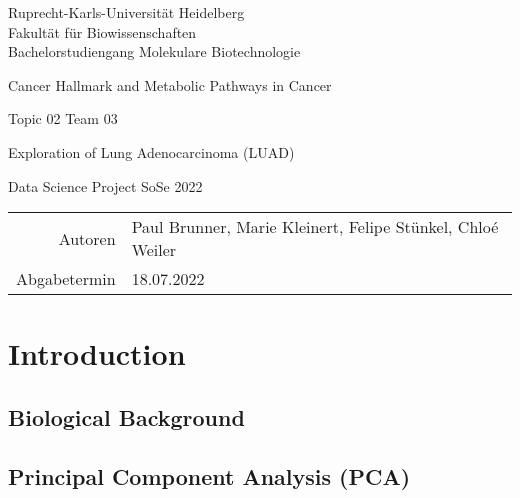 \documentclass[
  parskip,
  oneside]{scrreprt}
\author{}
\date{\vspace{-2.5em}}
\begin{document}
\begin{titlepage}
\centering
    {\Large Ruprecht-Karls-Universität Heidelberg\\
        Fakultät für Biowissenschaften\\
        Bachelorstudiengang Molekulare Biotechnologie\\}

    {}
    {

        {\Huge Cancer Hallmark and Metabolic Pathways in Cancer}

      {\Huge Topic 02 Team 03}

        {\Huge Exploration of Lung Adenocarcinoma (LUAD)}

    }

    {\Large Data Science Project SoSe 2022}


    {\Large
        \begin{tabular}{rl}
            Autoren & Paul Brunner, Marie Kleinert, Felipe Stünkel, Chloé Weiler\\
            Abgabetermin &18.07.2022\\
        \end{tabular}
    }


\end{titlepage}

\hypertarget{introduction}{%
\chapter{Introduction}\label{introduction}}

\hypertarget{biological-background}{%
\section{Biological Background}\label{biological-background}}

\hypertarget{principal-component-analysis-pca}{%
\section{Principal Component Analysis
(PCA)}\label{principal-component-analysis-pca}}
\end{document}
